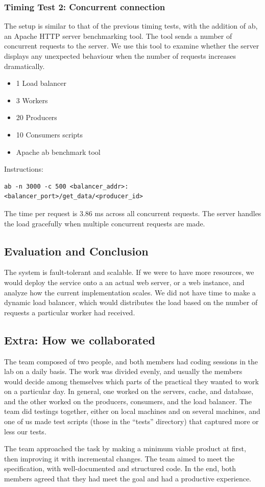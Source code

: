\documentclass{sigchi}
\begin{document}
\subsubsection{Timing Test 2: Concurrent connection}

The setup is similar to that of the previous timing tests, with the addition of ab, an Apache HTTP server benchmarking tool. The tool sends a number of concurrent requests to the server. We use this tool to examine whether the server displays any unexpected behaviour when the number of requests increases dramatically.

\begin{itemize}
  \item 1 Load balancer
  \item 3 Workers
  \item 20 Producers
  \item 10 Consumers scripts
  \item Apache ab benchmark tool
\end{itemize}

Instructions:

\vspace*{\baselineskip}
\begin{lstlisting}[caption={Apache ab testing: instruction}, mathescape, upquote=true]
  ab -n 3000 -c 500 <balancer_addr>:<balancer_port>/get_data/<producer_id>
\end{lstlisting}

The time per request is 3.86 ms across all concurrent requests. The server handles the load gracefully when multiple concurrent requests are made.

\subsection{Evaluation and Conclusion}

The system is fault-tolerant and scalable. If we were to have more resources, we would deploy the service onto a an actual web server, or a web instance, and analyze how the current implementation scales. We did not have time to make a dynamic load balancer, which would distributes the load based on the number of requests a particular worker had received.

\subsection{Extra: How we collaborated}

The team composed of two people, and both members had coding sessions in the lab on a daily basis. The work was divided evenly, and usually the members would decide among themselves which parts of the practical they wanted to work on a particular day. In general, one worked on the servers, cache, and database, and the other worked on the producers, consumers, and the load balancer. The team did testings together, either on local machines and on several machines, and one of us made test scripts (those in the \enquote{tests} directory) that captured more or less our tests.

The team approached the task by making a minimum viable product at first, then improving it with incremental changes. The team aimed to meet the specification, with well-documented and structured code. In the end, both members agreed that they had meet the goal and had a productive experience.
\end{document}
